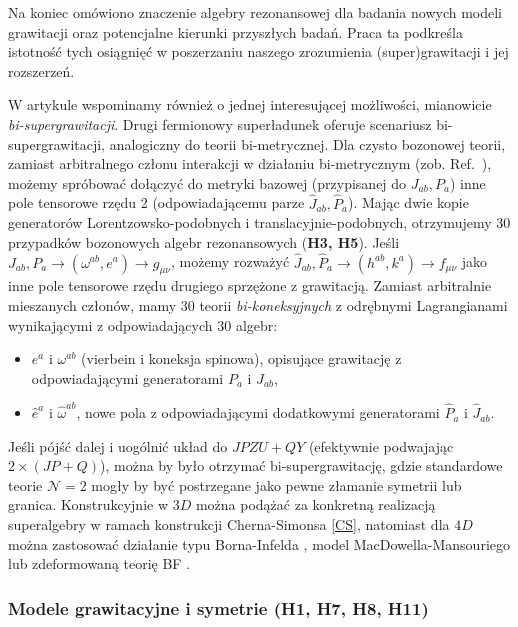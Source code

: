 \documentclass[12pt,a4paper]{article}
\begin{document}
Na koniec omówiono znaczenie algebry rezonansowej dla badania nowych modeli grawitacji oraz potencjalne kierunki przyszłych badań. Praca ta podkreśla istotność tych osiągnięć w poszerzaniu naszego zrozumienia (super)grawitacji i jej rozszerzeń.

W artykule wspominamy również o jednej interesującej możliwości, mianowicie \textit{bi-supergrawitacji}. Drugi fermionowy superładunek oferuje scenariusz bi-supergrawitacji, analogiczny do teorii bi-metrycznej. Dla czysto bozonowej teorii, zamiast arbitralnego członu interakcji w działaniu bi-metrycznym (zob. Ref.~\cite{Durka:2011va, Hoseinzadeh:2017lkh}), możemy spróbować dołączyć do metryki bazowej (przypisanej do $J_{ab}, P_{a}$) inne pole tensorowe rzędu 2 (odpowiadającemu parze $\hat{J}_{ab},\hat{P}_{a}$). Mając dwie kopie generatorów Lorentzowsko-podobnych i translacyjnie-podobnych, otrzymujemy $30$ przypadków bozonowych algebr rezonansowych (\textbf{H3, H5}). Jeśli $J_{ab},P_a \to (\omega^{ab}, e^a ) \to g_{\mu\nu}$, możemy rozważyć $\hat{J}_{ab}, \hat{P}_a \to (h^{ab}, k^a) \to f_{\mu\nu}$ jako inne pole tensorowe rzędu drugiego sprzężone z grawitacją. Zamiast arbitralnie mieszanych członów, mamy $30$ teorii \textit{bi-koneksyjnych} z odrębnymi Lagrangianami wynikającymi z odpowiadających $30$ algebr:
\begin{itemize}
	\item $e^a$ i $\omega^{ab}$ (vierbein i koneksja spinowa), opisujące grawitację z odpowiadającymi generatorami $P_a$ i $J_{ab}$,
	\item $\hat{e}^a$ i $\hat{\omega}^{ab}$, nowe pola z odpowiadającymi dodatkowymi generatorami $\hat{P}_a$ i $\hat{J}_{ab}$.
\end{itemize}

Jeśli pójść dalej i uogólnić układ do $JPZU+QY$ (efektywnie podwajając $2\times (JP+Q)$), można by było otrzymać bi-supergrawitację, gdzie standardowe teorie $\mathcal{N}=2$ mogły by być postrzegane jako pewne złamanie symetrii lub granica. Konstrukcyjnie w $3D$ można podążać za konkretną realizacją superalgebry w ramach konstrukcji Cherna-Simonsa \eqref{CS}, natomiast dla $4D$ można zastosować działanie typu Borna-Infelda \cite{Concha:2014vka}, model MacDowella-Mansouriego \cite{MacDowell:1977jt} lub zdeformowaną teorię BF \cite{Durka:2011nf, Durka:2012wd}.


\subsubsection{Modele grawitacyjne i symetrie (H1, H7, H8, H11)}
\end{document}

